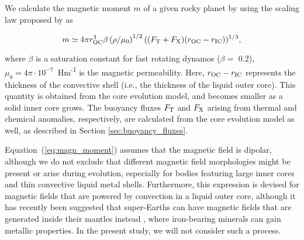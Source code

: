 \documentclass[draft]{agujournal2019} %
\begin{document}
We calculate the magnetic moment $m$ of a given rocky planet by using the scaling law proposed by  as
\begin{linenomath*} 
\begin{equation}
	m \simeq 4 \pi r_{\mathrm{OC}}^{3} \beta \left(\rho / \mu_{\mathrm{0}}\right)^{1 / 2}((F_{\rm T}+F_{\rm X}) (r_{\rm OC}-r_{\rm IC}))^{1 / 3},
\label{eq:magn_moment}
\end{equation}
\end{linenomath*}
where $\beta$ is a saturation constant for fast rotating dynamos ($\beta = $ 0.2), $\mu_{\mathrm{0}} = 4 \pi \cdot 10^{-7}$~Hm\textsuperscript{-1} is the magnetic permeability. Here, $r_{\rm OC}-r_{\rm IC}$ represents the thickness of the convective shell (i.e., the thickness of the liquid outer core). This quantity is obtained from the core evolution model, and becomes smaller as a solid inner core grows. The buoyancy fluxes $F_{\rm T}$ and $F_{\rm X}$ arising from thermal and chemical anomalies, respectively, are calculated from the core evolution model as well, as described in Section \ref{sec:buoyancy_fluxes}.

Equation~(\ref{eq:magn_moment}) assumes that the magnetic field is dipolar, although we do not exclude that different magnetic field morphologies might be present or arise during evolution, especially for bodies featuring large inner cores and thin convective liquid metal shells. Furthermore, this expression is devised for magnetic fields that are powered by convection in a liquid outer core, although it has recently been suggested that super-Earths can have magnetic fields that are generated inside their mantles instead \cite{soubiran_electrical_2018}, where iron-bearing minerals can gain metallic properties. In the present study, we will not consider such a process. 
\end{document}
